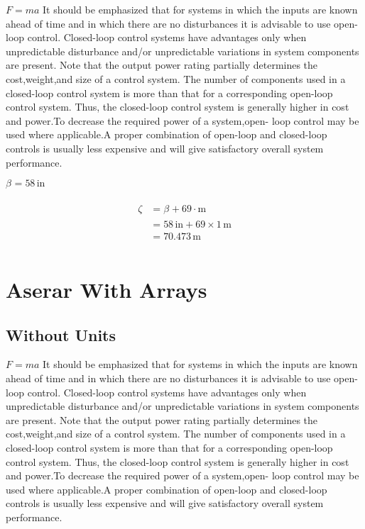 \documentclass{report}
\begin{document}
$F = ma$ It should be emphasized that for systems in which the inputs are known ahead of time and in which there are no disturbances it is advisable to use open-loop control.  Closed-loop control systems have advantages only when unpredictable disturbance  and/or unpredictable variations in system components are present. Note that the  output power rating partially determines the cost,weight,and size of a control system.  The number of components used in a closed-loop control system is more than that for  a corresponding open-loop control system. Thus, the closed-loop control system is generally higher in cost and power.To decrease the required power of a system,open-  loop control may be used where applicable.A proper combination of open-loop and  closed-loop controls is usually less expensive and will give satisfactory overall system  performance.

$\beta_{} = 58\,\mathrm{in}$ 

\begin{align}
\begin{split}
\zeta	&= \beta_{} + 69 \cdot \mathrm{m}\\
		&= 58\,\mathrm{in} + 69 \times 1\,\mathrm{m}\\
		&= 70.473\,\mathrm{m}\\
\end{split}
\end{align}

\chapter{Aserar With Arrays}
\section{Without Units}

$F = ma$ It should be emphasized that for systems in which the inputs are known ahead of time and in which there are no disturbances it is advisable to use open-loop control.  Closed-loop control systems have advantages only when unpredictable disturbance  and/or unpredictable variations in system components are present. Note that the  output power rating partially determines the cost,weight,and size of a control system.  The number of components used in a closed-loop control system is more than that for  a corresponding open-loop control system. Thus, the closed-loop control system is generally higher in cost and power.To decrease the required power of a system,open-  loop control may be used where applicable.A proper combination of open-loop and  closed-loop controls is usually less expensive and will give satisfactory overall system  performance.
\end{document}

